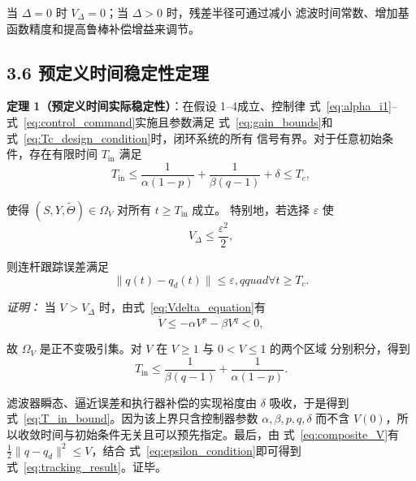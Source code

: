 \documentclass{article}
\begin{document}
当 $\Delta=0$ 时 $V_\Delta=0$；当 $\Delta>0$ 时，残差半径可通过减小
滤波时间常数、增加基函数精度和提高鲁棒补偿增益来调节。

\subsection{3.6 预定义时间稳定性定理}
\label{subsec:stability_theorem}

\textbf{定理 1（预定义时间实际稳定性）}：在假设 1--4成立、控制律
式~\eqref{eq:alpha_i1}--式~\eqref{eq:control_command}实施且参数满足
式~\eqref{eq:gain_bounds}和式~\eqref{eq:Tc_design_condition}时，闭环系统的所有
信号有界。对于任意初始条件，存在有限时间 $T_{\mathrm{in}}$ 满足
\begin{equation}
 T_{\mathrm{in}}\leq
 \frac{1}{\alpha(1-p)}+\frac{1}{\beta(q-1)}+\delta
 \leq T_c,

 \tag{74}
\label{eq:T_in_bound}
\end{equation}

使得 $(S,Y,\widetilde\Theta)\in\Omega_V$ 对所有 $t\geq T_{\mathrm{in}}$ 成立。
特别地，若选择 $\varepsilon$ 使
\begin{equation}
 V_\Delta\leq\frac{\varepsilon^2}{2},

 \tag{75}
\label{eq:epsilon_condition}
\end{equation}

则连杆跟踪误差满足
\begin{equation}
 \|q(t)-q_d(t)\|\leq\varepsilon,qquad \forall t\geq T_c .

 \tag{76}
\label{eq:tracking_result}
\end{equation}


\textit{证明：} 当 $V>V_\Delta$ 时，由式~\eqref{eq:Vdelta_equation}有
\begin{equation}
 \dot V\leq-\alpha V^p-\beta V^q<0,

 \tag{77}
\label{eq:Vdot_outside}
\end{equation}

故 $\Omega_V$ 是正不变吸引集。对 $V$ 在 $V\geq1$ 与 $0<V\leq1$ 的两个区域
分别积分，得到
\begin{equation}
 T_{\mathrm{in}}
 \leq\frac{1}{\beta(q-1)}+\frac{1}{\alpha(1-p)}.

 \tag{78}
\label{eq:integral_bound}
\end{equation}

滤波器瞬态、逼近误差和执行器补偿的实现裕度由 $\delta$ 吸收，于是得到
式~\eqref{eq:T_in_bound}。因为该上界只含控制器参数 $\alpha,\beta,p,q,\delta$
而不含 $V(0)$，所以收敛时间与初始条件无关且可以预先指定。最后，由
式~\eqref{eq:composite_V}有 $\frac12\|q-q_d\|^2\leq V$，结合
式~\eqref{eq:epsilon_condition}即可得到式~\eqref{eq:tracking_result}。证毕。
\end{document}
